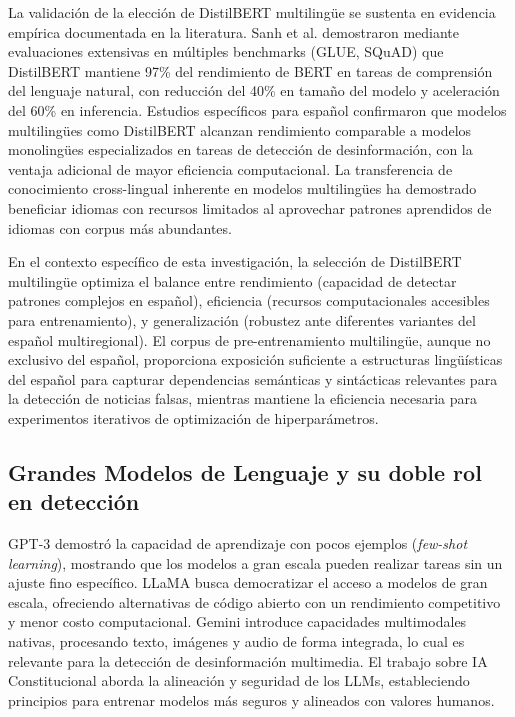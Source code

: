 La validación de la elección de DistilBERT multilingüe se sustenta en evidencia empírica documentada en la literatura. Sanh et al. \cite{sanh2019distilbert} demostraron mediante evaluaciones extensivas en múltiples benchmarks (GLUE, SQuAD) que DistilBERT mantiene 97\% del rendimiento de BERT en tareas de comprensión del lenguaje natural, con reducción del 40\% en tamaño del modelo y aceleración del 60\% en inferencia. Estudios específicos para español \cite{blanco2024enhancing} confirmaron que modelos multilingües como DistilBERT alcanzan rendimiento comparable a modelos monolingües especializados en tareas de detección de desinformación, con la ventaja adicional de mayor eficiencia computacional. La transferencia de conocimiento cross-lingual inherente en modelos multilingües ha demostrado beneficiar idiomas con recursos limitados al aprovechar patrones aprendidos de idiomas con corpus más abundantes.

En el contexto específico de esta investigación, la selección de DistilBERT multilingüe optimiza el balance entre rendimiento (capacidad de detectar patrones complejos en español), eficiencia (recursos computacionales accesibles para entrenamiento), y generalización (robustez ante diferentes variantes del español multiregional). El corpus de pre-entrenamiento multilingüe, aunque no exclusivo del español, proporciona exposición suficiente a estructuras lingüísticas del español para capturar dependencias semánticas y sintácticas relevantes para la detección de noticias falsas, mientras mantiene la eficiencia necesaria para experimentos iterativos de optimización de hiperparámetros.

\subsection{Grandes Modelos de Lenguaje y su doble rol en detección}

GPT-3 \cite{brown2020language} demostró la capacidad de aprendizaje con pocos ejemplos (\textit{few-shot learning}), mostrando que los modelos a gran escala pueden realizar tareas sin un ajuste fino específico. LLaMA \cite{touvron2023llama} busca democratizar el acceso a modelos de gran escala, ofreciendo alternativas de código abierto con un rendimiento competitivo y menor costo computacional. Gemini \cite{gemini2023family} introduce capacidades multimodales nativas, procesando texto, imágenes y audio de forma integrada, lo cual es relevante para la detección de desinformación multimedia. El trabajo sobre IA Constitucional \cite{bai2022constitutional} aborda la alineación y seguridad de los LLMs, estableciendo principios para entrenar modelos más seguros y alineados con valores humanos.

